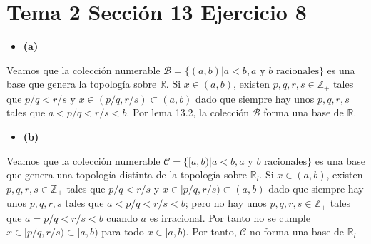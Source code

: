 \documentclass{article}
\begin{document}
\section{Tema 2 Sección 13 Ejercicio 8}
\begin{itemize}
\item \bf (a) \rm
\end{itemize}
Veamos que la colección numerable $\mathcal{B}=\{(a,b)|a<b ,a\text{ y }b\text{ racionales}\}$ es una base que genera la topología sobre $\mathbb{R}$. Si $x\in (a,b)$, existen $p,q,r,s\in \mathbb{Z}_+$ tales que $p/q<r/s$ y $x\in(p/q,r/s)\subset (a,b)$ dado que siempre hay unos $p,q,r,s$ tales que $a<p/q<r/s<b$. Por lema 13.2, la colección $\mathcal{B}$ forma una base de $\mathbb{R}$. 
\begin{itemize}
\item \bf (b) \rm
\end{itemize}
Veamos que la colección numerable $\mathcal{C}=\{[a,b)|a<b ,a\text{ y }b\text{ racionales}\}$ es una base que genera una topología distinta de la topología sobre $\mathbb{R}_l$. Si $x\in (a,b)$, existen $p,q,r,s\in \mathbb{Z}_+$ tales que $p/q<r/s$ y $x\in[p/q,r/s)\subset (a,b)$ dado que siempre hay unos $p,q,r,s$ tales que $a<p/q<r/s<b$; pero no hay unos $p,q,r,s\in \mathbb{Z}_+$ tales que $a= p/q<r/s<b$ cuando $a$ es irracional. Por tanto no se cumple $x\in[p/q,r/s)\subset [a,b)$ para todo $x\in [a,b)$. Por tanto, $\mathcal{C}$ no forma una base de $\mathbb{R}_l$
\end{document}
